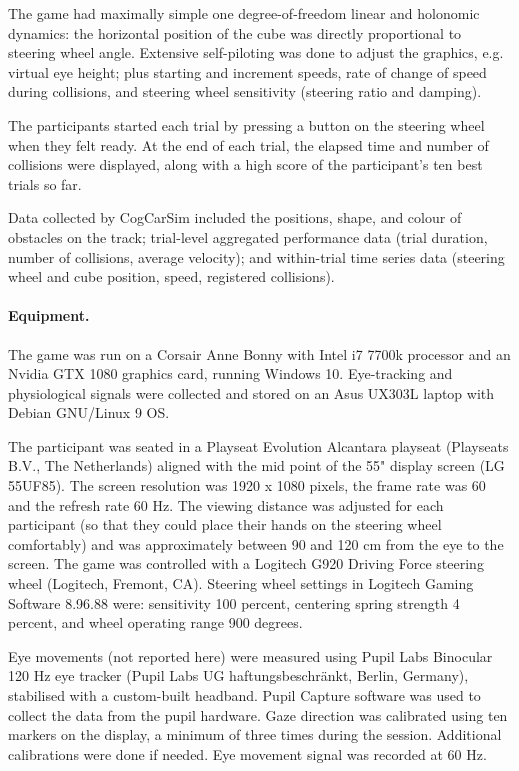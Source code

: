 \documentclass[fleqn,10pt]{wlscirep}
\begin{document}
The game had maximally simple one degree-of-freedom linear and holonomic dynamics: the horizontal position of the cube was directly proportional to steering wheel angle. Extensive self-piloting was done to adjust the graphics, e.g. virtual eye height; plus starting and increment speeds, rate of change of speed during collisions, and steering wheel sensitivity (steering ratio and damping).

The participants started each trial by pressing a button on the steering wheel when they felt ready. At the end of each trial, the elapsed time and number of collisions were displayed, along with a high score of the participant's ten best trials so far.

Data collected by CogCarSim included the positions, shape, and colour of obstacles on the track; trial-level aggregated performance data (trial duration, number of collisions, average velocity); and within-trial time series data (steering wheel and cube position, speed, registered collisions).

\paragraph{Equipment.} The game was run on a Corsair Anne Bonny with Intel i7 7700k processor and an Nvidia GTX 1080 graphics card, running Windows 10. Eye-tracking and physiological signals were collected and stored on an Asus UX303L laptop with Debian GNU/Linux 9 OS.

The participant was seated in a Playseat Evolution Alcantara playseat (Playseats B.V., The Netherlands) aligned with the mid point of the 55" display screen (LG 55UF85). The screen resolution was 1920 x 1080 pixels, the frame rate was 60 and the refresh rate 60 Hz. The viewing distance was adjusted for each participant (so that they could place their hands on the steering wheel comfortably) and was approximately between 90 and 120 cm from the eye to the screen. The game was controlled with a Logitech G920 Driving Force steering wheel (Logitech, Fremont, CA). Steering wheel settings in Logitech Gaming Software 8.96.88 were: sensitivity 100 percent, centering spring strength 4 percent, and wheel operating range 900 degrees.

Eye movements (not reported here) were measured using Pupil Labs Binocular 120 Hz eye tracker (Pupil Labs UG haftungsbeschränkt, Berlin, Germany), stabilised with a custom-built headband. Pupil Capture software was used to collect the data from the pupil hardware. Gaze direction was calibrated using ten markers on the display, a minimum of three times during the session. Additional calibrations were done if needed. Eye movement signal was recorded at 60 Hz.
\end{document}
